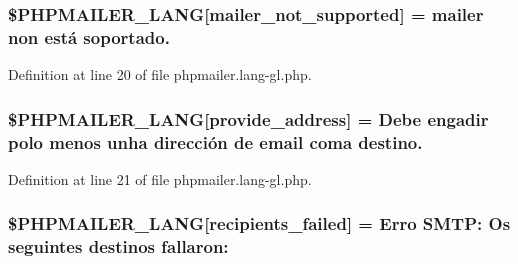 \subsubsection[{\texorpdfstring{\$\+P\+H\+P\+M\+A\+I\+L\+E\+R\+\_\+\+L\+A\+NG}{$PHPMAILER_LANG}}]{\setlength{\rightskip}{0pt plus 5cm}\$P\+H\+P\+M\+A\+I\+L\+E\+R\+\_\+\+L\+A\+NG\mbox{[}\textquotesingle{}mailer\+\_\+not\+\_\+supported\textquotesingle{}\mbox{]} = \textquotesingle{} mailer non está soportado.\textquotesingle{}}\hypertarget{phpmailer_8lang-gl_8php_aa2ebcb8833ee83a7ad67401c4bb3a6ad}{}\label{phpmailer_8lang-gl_8php_aa2ebcb8833ee83a7ad67401c4bb3a6ad}


Definition at line 20 of file phpmailer.\+lang-\/gl.\+php.

\subsubsection[{\texorpdfstring{\$\+P\+H\+P\+M\+A\+I\+L\+E\+R\+\_\+\+L\+A\+NG}{$PHPMAILER_LANG}}]{\setlength{\rightskip}{0pt plus 5cm}\$P\+H\+P\+M\+A\+I\+L\+E\+R\+\_\+\+L\+A\+NG\mbox{[}\textquotesingle{}provide\+\_\+address\textquotesingle{}\mbox{]} = \textquotesingle{}Debe engadir polo menos unha dirección de {\bf email} coma destino.\textquotesingle{}}\hypertarget{phpmailer_8lang-gl_8php_a8b97897c2406b7392b056f375feeefbb}{}\label{phpmailer_8lang-gl_8php_a8b97897c2406b7392b056f375feeefbb}


Definition at line 21 of file phpmailer.\+lang-\/gl.\+php.

\subsubsection[{\texorpdfstring{\$\+P\+H\+P\+M\+A\+I\+L\+E\+R\+\_\+\+L\+A\+NG}{$PHPMAILER_LANG}}]{\setlength{\rightskip}{0pt plus 5cm}\$P\+H\+P\+M\+A\+I\+L\+E\+R\+\_\+\+L\+A\+NG\mbox{[}\textquotesingle{}recipients\+\_\+failed\textquotesingle{}\mbox{]} = \textquotesingle{}Erro S\+M\+T\+P\+: Os seguintes destinos fallaron\+: \textquotesingle{}}\hypertarget{phpmailer_8lang-gl_8php_a7589d30bb9b368327c2df015f3e6bcba}{}\label{phpmailer_8lang-gl_8php_a7589d30bb9b368327c2df015f3e6bcba}


